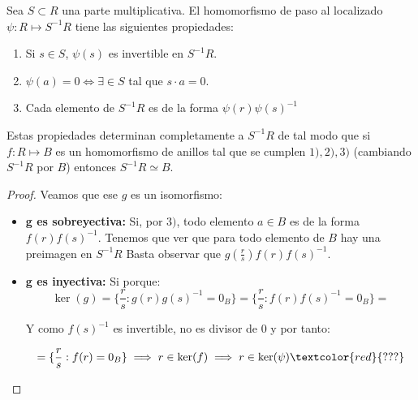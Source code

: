 	\begin{theorem}
		Sea $S \subset R$ una parte multiplicativa. El homomorfismo de paso al localizado $\psi:R \longmapsto S^{-1}R$ tiene las siguientes propiedades:
		\begin{enumerate}
			\item Si $s\in S$, $\psi(s)$ es invertible en $S^{-1}R$.
			\item $\psi(a)=0 \Leftrightarrow \exists \in S$ tal que $s\cdot a=0$.
			\item Cada elemento de $S^{-1}R$ es de la forma $\psi(r)\psi(s)^{-1}$
		\end{enumerate}
		
		Estas propiedades determinan completamente a $S^{-1}R$ de tal modo que si $f:R \longmapsto B$ es un homomorfismo de anillos tal que se cumplen $1), 2), 3)$ (cambiando $S^{-1}R$ por $B$) entonces $S^{-1}R \simeq B$.
	\end{theorem}
	
	\begin{proof}
		
		Veamos que ese $g$ es un isomorfismo:
		\begin{itemize}
			\item \textbf{g es sobreyectiva:} Si, por $3)$, todo elemento $a \in B$ es de la forma $f(r)f(s)^{-1}$. Tenemos que ver que para todo elemento de $B$ hay una preimagen en $S^{-1}R$ Basta observar que $g\left( \frac{r}{s} \right) f(r)f(s)^{-1}$.
			\item \textbf{g es inyectiva:} Si porque:
			$$\ker(g) = \{ \frac{r}{s}: g(r)g(s)^{-1}=0_B \} = \{ \frac{r}{s}: f(r)f(s)^{-1}=0_B \} = $$
			
			Y como $f(s)^{-1}$ es invertible, no es divisor de 0 y por tanto:
			
			$$ = \{ \frac{r}{s}: f(r)=0_B \} \implies r \in \ker(f) \implies r \in \ker(\psi)\textcolor{red}{???}$$ 
		\end{itemize}	
	\end{proof}
	
